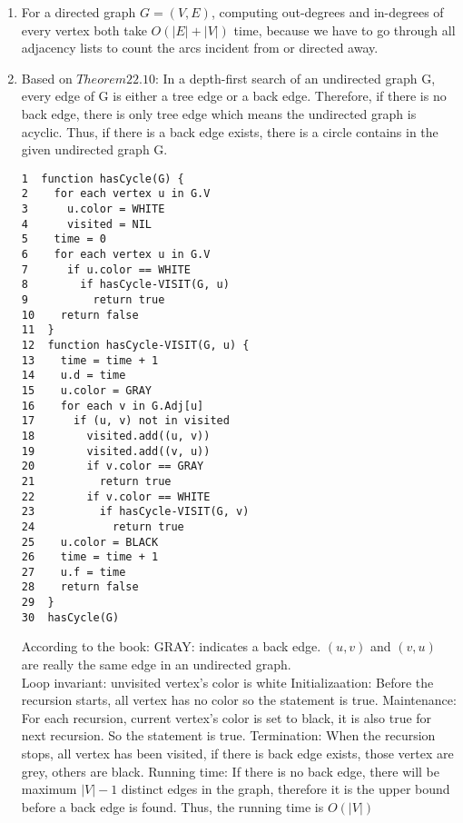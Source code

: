 \documentclass{article}
\begin{document}
\begin{enumerate}
\item
For a directed graph $G = (V, E)$, computing out-degrees and in-degrees of every vertex both take $O(|E|+|V|)$ time, because we have to go through all adjacency lists to count the arcs incident from or directed away.

\item
Based on $Theorem 22.10$: In a depth-first search of an undirected graph G, every edge of G is either a tree edge or a back edge. Therefore, if there is no back edge, there is only tree edge which means the undirected graph is acyclic. Thus, if there is a back edge exists, there is a circle contains in the given undirected graph G.
\begin{verbatim}
1  function hasCycle(G) {
2    for each vertex u in G.V
3      u.color = WHITE
4      visited = NIL
5    time = 0
6    for each vertex u in G.V
7      if u.color == WHITE
8        if hasCycle-VISIT(G, u)
9          return true
10    return false
11  }
12  function hasCycle-VISIT(G, u) {
13    time = time + 1
14    u.d = time
15    u.color = GRAY
16    for each v in G.Adj[u]
17      if (u, v) not in visited
18        visited.add((u, v))
19        visited.add((v, u))
20        if v.color == GRAY
21          return true
22        if v.color == WHITE
23          if hasCycle-VISIT(G, v)
24            return true
25    u.color = BLACK
26    time = time + 1
27    u.f = time
28    return false
29  }
30  hasCycle(G)
\end{verbatim}
According to the book: GRAY: indicates a back edge. $(u,v)$ and $(v,u)$ are really the same edge in an undirected graph. \\
Loop invariant: unvisited vertex's color is white
Initializaation: Before the recursion starts, all vertex has no color so the statement is true.
Maintenance: For each recursion, current vertex's color is set to black, it is also true for next recursion. So the statement is true.
Termination: When the recursion stops, all vertex has been visited, if there is back edge exists, those vertex are grey, others are black.
Running time: If there is no back edge, there will be maximum $|V|-1$ distinct edges in the graph, therefore it is the upper bound before a back edge is found. Thus, the running time is $O(|V|)$

\end{enumerate}
\end{document}

